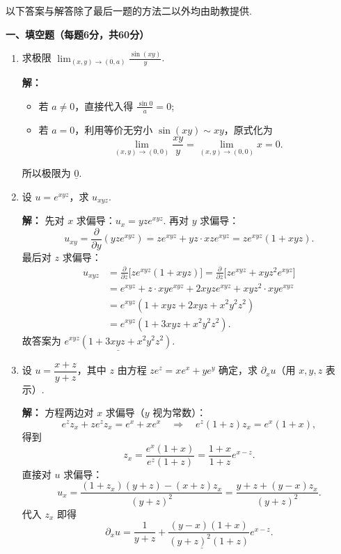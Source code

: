 以下答案与解答除了最后一题的方法二以外均由助教提供.

\textbf{一、填空题（每题6分，共60分）}

\begin{enumerate}

\item
求极限 $\displaystyle \lim_{(x,y)\to(0,a)}\frac{\sin(xy)}{y}$.

\textbf{解：}
\begin{itemize}
\item[$\cdot$]若 $a\neq0$，直接代入得 $\displaystyle\frac{\sin0}{a}=0$;
\item[$\cdot$]若 $a=0$，利用等价无穷小 $\sin(xy)\sim xy$，原式化为
\[
\lim_{(x,y)\to(0,0)}\frac{xy}{y}=\lim_{(x,y)\to(0,0)}x=0.
\]
\end{itemize}
所以极限为 $\underline{0}$.

\item
设 $u=e^{xyz}$，求 $u_{xyz}$.

\textbf{解：}
先对 $x$ 求偏导：$u_x = yz e^{xyz}$. 再对 $y$ 求偏导：
\[
u_{xy} = \frac{\partial}{\partial y}(yz e^{xyz}) = z e^{xyz} + yz \cdot xz e^{xyz} = z e^{xyz}(1 + xyz).
\]
最后对 $z$ 求偏导：
\begin{align*}
u_{xyz} &= \frac{\partial}{\partial z}\bigl[ z e^{xyz}(1 + xyz) \bigr] 
= \frac{\partial}{\partial z}\bigl[ z e^{xyz} + xyz^2 e^{xyz} \bigr] \\
&= e^{xyz} + z \cdot xy e^{xyz} + 2xyz e^{xyz} + xyz^2 \cdot xy e^{xyz} \\
&= e^{xyz}(1 + xyz + 2xyz + x^2y^2z^2) \\
&= e^{xyz}(1 + 3xyz + x^2y^2z^2).
\end{align*}
故答案为 $\underline{e^{xyz}(1+3xyz+x^2y^2z^2)}$.

\item
设 $u=\dfrac{x+z}{y+z}$，其中 $z$ 由方程 $z e^z = x e^x + y e^y$ 确定，求 $\partial_x u$（用 $x,y,z$ 表示）.

\textbf{解：}
方程两边对 $x$ 求偏导（$y$ 视为常数）：
\[
e^z z_x + z e^z z_x = e^x + x e^x \quad\Longrightarrow\quad e^z(1+z)z_x = e^x(1+x),
\]
得到
\[
z_x = \frac{e^x(1+x)}{e^z(1+z)} = \frac{1+x}{1+z}e^{x-z}.
\]
直接对 $u$ 求偏导：
\[
u_x = \frac{(1+z_x)(y+z) - (x+z)z_x}{(y+z)^2}
= \frac{y+z + (y-x)z_x}{(y+z)^2}.
\]
代入 $z_x$ 即得
\[
\partial_x u = \underline{\frac{1}{y+z} + \frac{(y-x)(1+x)}{(y+z)^2(1+z)}e^{x-z}}.
\]


\end{enumerate}
